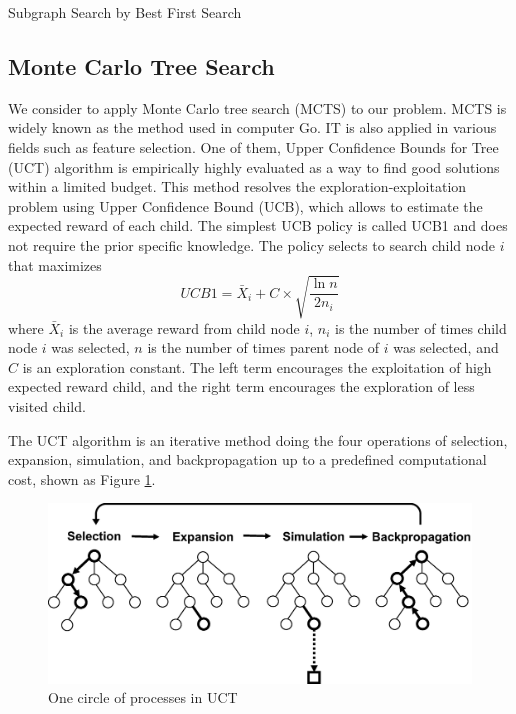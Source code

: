 \begin{algorithm2e}[H]
  \caption{Subgraph Search by Best First Search}
  \label{alg:bfs}
\end{algorithm2e}

\subsection{Monte Carlo Tree Search}
We consider to apply Monte Carlo tree search (MCTS) 
\cite{Levente:2006, Romaric:2010, Cameron:2012} to our problem. 
MCTS is widely known as the method used in computer Go. 
IT is  also applied in various fields such as feature selection. 
One of them, Upper Confidence Bounds for Tree (UCT) algorithm 
\cite{Levente:2006} is empirically highly evaluated as a way to find good solutions within a limited budget.
This method resolves the exploration-exploitation problem using Upper Confidence Bound (UCB),
which allows to estimate the expected reward of each child.
The simplest UCB policy is called UCB1 and does not require the prior specific knowledge.
The policy selects to search child node $i$ that maximizes
\begin{equation}
  \label{eq:ucb}
  UCB1 = \bar{X}_{i} + C \times \sqrt{\frac{\ln{n}}{2 n_{i}}}
\end{equation}
where $\bar{X}_{i}$ is the average reward from child node $i$, 
$n_{i}$ is the number of times child node $i$ was selected, 
$n$ is the number of times parent node of $i$ was selected,
and $C$ is an exploration constant.
The left term encourages the exploitation of high expected reward child,
and the right term encourages the exploration of less visited child.

The UCT algorithm is an iterative method 
doing the four operations of selection, expansion, 
simulation, and backpropagation up to a predefined computational cost, shown as Figure \ref{fig:MCTS}.
\begin{figure}[t]
  \centering
  \includegraphics[width=0.9\linewidth]{img/MCTS.eps}
  \caption{One circle of processes in UCT}
  \label{fig:MCTS}
\end{figure}


